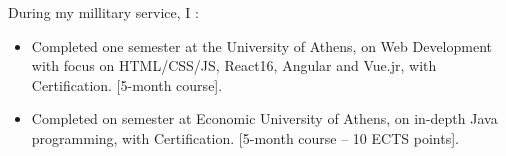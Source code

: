 
During my millitary service, I :
\begin{itemize}
    \item Completed one semester at the University of Athens, on Web Development with focus on HTML/CSS/JS, React16, Angular and Vue.jr, with Certification. [5-month course].
    \item Completed on semester at Economic University of Athens, on in-depth Java programming, with Certification. [5-month course – 10 ECTS points].

\end{itemize}


